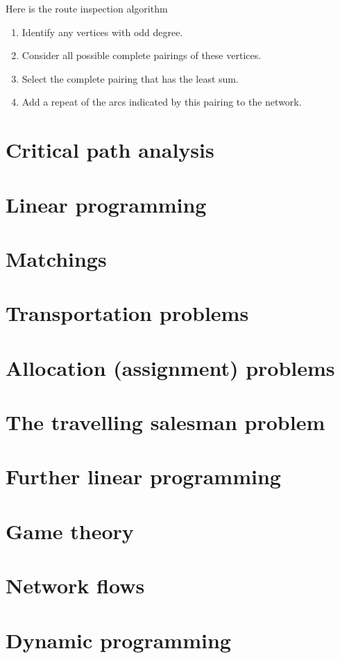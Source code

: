 \documentclass[a4paper]{article}
\begin{document}
\begin{defi}
Here is the route inspection algorithm
\begin{enumerate}
\item Identify any vertices with odd degree.
\item Consider all possible complete pairings of these vertices.
\item Select the complete pairing that has the least sum.
\item Add a repeat of the arcs indicated by this pairing to the network.
\end{enumerate}
\end{defi}

\begin{eg}

\end{eg}


\section{Critical path analysis}
\begin{eg}

\end{eg}

\section{Linear programming}

\section{Matchings}

\section{Transportation problems}

\section{Allocation (assignment) problems}

\section{The travelling salesman problem}

\section{Further linear programming}

\section{Game theory}

\section{Network flows}

\section{Dynamic programming}

\printindex
\end{document}
